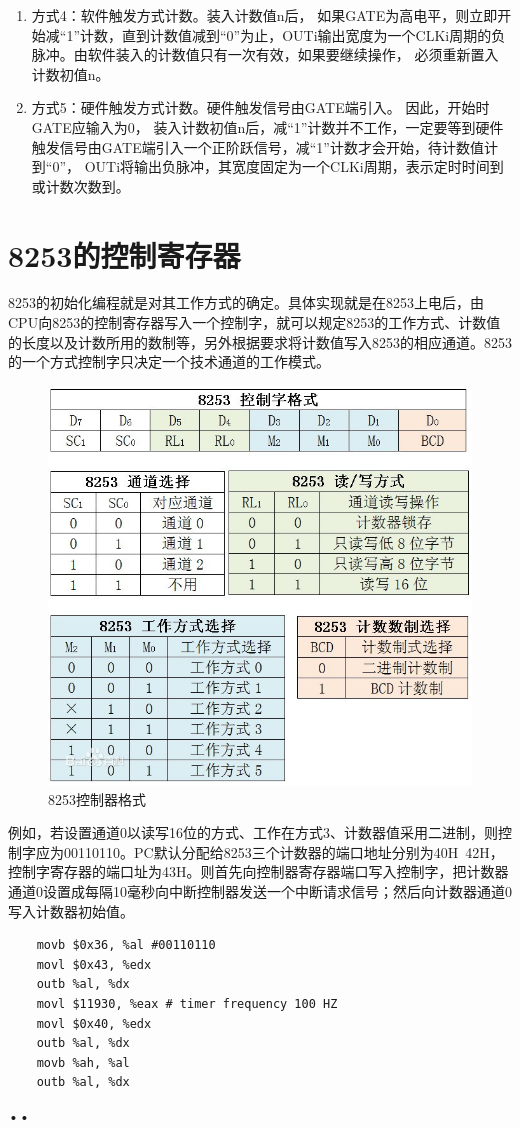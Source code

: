 \documentclass[12pt]{article}
\begin{document}
\begin{list}{•}{•}
\begin{enumerate}
\item 方式4：软件触发方式计数。装入计数值n后， 如果GATE为高电平，则立即开始减“1”计数，直到计数值减到“0”为止，OUTi输出宽度为一个CLKi周期的负脉冲。由软件装入的计数值只有一次有效，如果要继续操作， 必须重新置入计数初值n。
\item 方式5：硬件触发方式计数。硬件触发信号由GATE端引入。 因此，开始时GATE应输入为0， 装入计数初值n后，减“1”计数并不工作，一定要等到硬件触发信号由GATE端引入一个正阶跃信号，减“1”计数才会开始，待计数值计到“0”， OUTi将输出负脉冲，其宽度固定为一个CLKi周期，表示定时时间到或计数次数到。
\end{enumerate}

\section{8253的控制寄存器}
8253的初始化编程就是对其工作方式的确定。具体实现就是在8253上电后，由CPU向8253的控制寄存器写入一个控制字，就可以规定8253的工作方式、计数值的长度以及计数所用的数制等，另外根据要求将计数值写入8253的相应通道。8253的一个方式控制字只决定一个技术通道的工作模式。

\begin{figure}[htbp]
\centering
\includegraphics[scale=0.5]{fig/28.jpeg}
\caption{8253控制器格式}
\label{fig:Intel 8253 control word format}
\end{figure}
例如，若设置通道0以读写16位的方式、工作在方式3、计数器值采用二进制，则控制字应为00110110。PC默认分配给8253三个计数器的端口地址分别为40H~42H，控制字寄存器的端口址为43H。则首先向控制器寄存器端口写入控制字，把计数器通道0设置成每隔10毫秒向中断控制器发送一个中断请求信号；然后向计数器通道0写入计数器初始值。
\begin{lstlisting}   
	movb $0x36, %al #00110110
	movl $0x43, %edx
	outb %al, %dx
	movl $11930, %eax # timer frequency 100 HZ 
	movl $0x40, %edx
	outb %al, %dx
	movb %ah, %al
	outb %al, %dx
\end{lstlisting}

\end{list}{•}{•}
\end{document}

